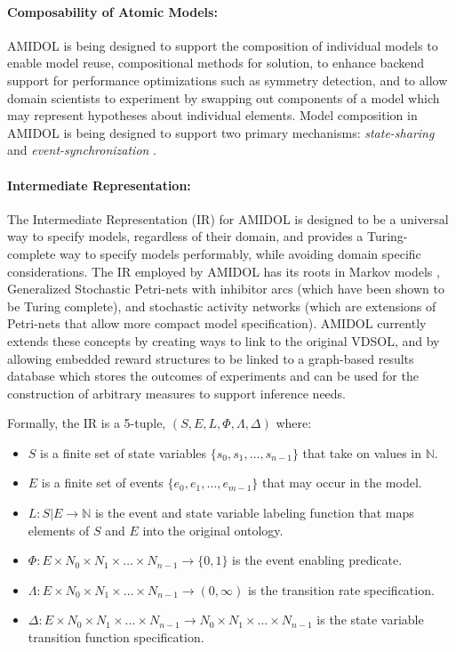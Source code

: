 \documentclass[11pt]{article}
\newcommand{\amidol}{\textsc{AMIDOL}}
\begin{document}
\paragraph{Composability of Atomic Models:}

\amidol{} is being designed to support the composition of individual models to enable model reuse, compositional methods for solution, to enhance backend support for performance optimizations such as symmetry detection, and to allow domain scientists to experiment by swapping out components of a model which may represent hypotheses about individual elements.  Model composition in \amidol{} is being designed to support two primary mechanisms: \emph{state-sharing} \cite{sanders1992dependability,sanders1988construction} and \emph{event-synchronization} \cite{lampka2002symbolic}.

\paragraph{Intermediate Representation:}

The Intermediate Representation (IR) for \amidol{} is designed to be a universal way to specify models, regardless of their domain, and provides a Turing-complete way to specify models performably, while avoiding domain specific considerations. The IR employed by \amidol{} has its roots in Markov models \cite{howard2012dynamic}, Generalized Stochastic Petri-nets with inhibitor arcs \cite{chiola1993generalized} (which have been shown to be Turing complete), and stochastic activity networks \cite{movaghar1985performability,sanders2000stochastic} (which are extensions of Petri-nets that allow more compact model specification).  \amidol{} currently extends these concepts by creating ways to link to the original VDSOL, and by allowing embedded reward structures to be linked to a graph-based results database which stores the outcomes of experiments and can be used for the construction of arbitrary measures to support inference needs.

Formally, the IR is a 5-tuple, $(S, E, L, \Phi, \Lambda, \Delta)$ where:
\begin{itemize}
\item $S$ is a finite set of state variables $\{s_0, s_1, \ldots, s_{n-1}\}$ that take on values in $\mathbb{N}$.
\item $E$ is a finite set of events $\{e_0, e_1, \ldots, e_{m-1}\}$ that may occur in the model.
\item $L: S|E \rightarrow \mathbb{N}$ is the event and state variable labeling function that maps elements of $S$ and $E$ into the original ontology.
\item $\Phi: E \times N_0 \times N_1 \times \ldots \times N_{n-1} \rightarrow \{0, 1\}$ is the event enabling predicate.
\item $\Lambda: E \times N_0 \times N_1 \times \ldots \times N_{n-1} \rightarrow (0, \infty)$ is the transition rate specification.
\item $\Delta: E \times N_0 \times N_1 \times \ldots \times N_{n-1} \rightarrow N_0 \times N_1 \times \ldots \times N_{n-1}$ is the state variable transition function specification.
\end{itemize}
\end{document}
